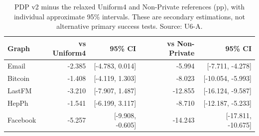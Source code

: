 \begin{table}[htbp]
\centering\small
\caption{PDP v2 minus the relaxed Uniform4 and Non-Private references (pp), with individual approximate 95\% intervals. These are secondary estimations, not alternative primary success tests. Source: U6-A.}\label{tab:references}
\begin{tabular}{lrrrr}
\toprule
Graph & vs Uniform4 & 95\% CI & vs Non-Private & 95\% CI\\ \midrule
Email & -2.385 & [-4.783, 0.014] & -5.994 & [-7.711, -4.278] \\
Bitcoin & -1.408 & [-4.119, 1.303] & -8.023 & [-10.054, -5.993] \\
LastFM & -3.210 & [-7.907, 1.487] & -12.855 & [-16.124, -9.587] \\
HepPh & -1.541 & [-6.199, 3.117] & -8.710 & [-12.187, -5.233] \\
Facebook & -5.257 & [-9.908, -0.605] & -14.243 & [-17.811, -10.675] \\
\bottomrule\end{tabular}
\end{table}
